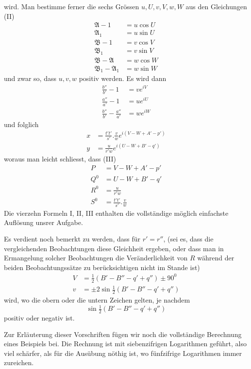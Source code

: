wird. Man bestimme ferner die sechs Grössen $u,U,v,V,w,W$ aus den Gleichungen (II)
\[
\begin{aligned}
\mathfrak{A}-1&=u\cos U\\
\mathfrak{A}_1&=u\sin U\\
\mathfrak{B}-1&=v\cos V\\
\mathfrak{B}_1&=v\sin V\\
\mathfrak{B}-\mathfrak{A}&=w\cos W\\
\mathfrak{B}_1-\mathfrak{A}_1&=w\sin W
\end{aligned}
\]
und zwar so, dass $u,v,w$ positiv werden. Es wird dann
\[
\begin{aligned}
\frac{b''}{b'}-1&=ve^{iV}\\
\frac{a''}{a'}-1&=ue^{iU}\\
\frac{b''}{b'}-\frac{a''}{a'}&=we^{iW}
\end{aligned}
\]
und folglich
\[
\begin{aligned}
x&=\frac{t't'}{s'}.\frac{v}{w}e^{i(V-W+A'-p')}\\
y&=\frac{u}{r'w}e^{i(U-W+B'-q')}
\end{aligned}
\]
woraus man leicht schliesst, dass (III)
\[
\begin{aligned}
P&=V-W+A'-p'\\
Q^0&=U-W+B'-q'\\
R^0&=\frac{u}{r'w}\\
S^0&=\frac{t't'}{s'}.\frac{v}{w}
\end{aligned}
\]
Die vierzehn Formeln I, II, III enthalten die vollständige möglich einfachste Auflösung unsrer Aufgabe.

Es verdient noch bemerkt zu werden, dass für $r'=r''$, (sei es, dass die vergleichenden Beobachtungen diese Gleichheit ergeben, oder dass man in Ermangelung solcher Beobachtungen die Veränderlichkeit von $R$ während der beiden Beobachtungssätze zu berücksichtigen nicht im Stande ist)
\[
\begin{aligned}
V&=\tfrac12(B'-B''-q'+q'')\pm90^0\\
v&=\pm2\sin\tfrac12(B'-B''-q'+q'')
\end{aligned}
\]
wird, wo die obern oder die untern Zeichen gelten, je nachdem
\[
\sin\tfrac12(B'-B''-q'+q'')
\]
positiv oder negativ ist.

Zur Erläuterung dieser Vorschriften fügen wir noch die vollständige Berechnung eines Beispiels bei. Die Rechnung ist mit siebenzifrigen Logarithmen geführt, also viel schärfer, als für die Ausübung nöthig ist, wo fünfzifrige Logarithmen immer zureichen.

